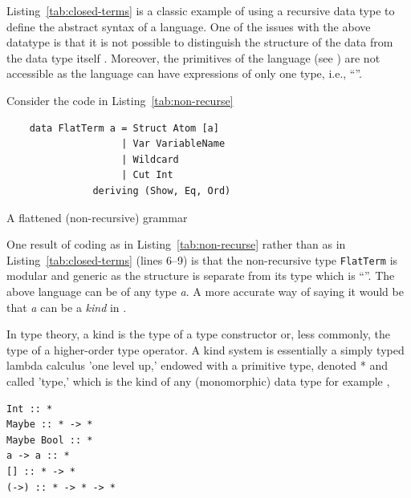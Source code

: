 \documentclass[thesis-solanki.tex]{subfiles}
\begin{document}
Listing~\ref{tab:closed-terms} is a classic example of using a recursive data type to define the
abstract syntax of a language.
One of the issues with the above datatype is that it is not possible to distinguish the structure of the data from
the data type itself \cite{sheard2004two}.
Moreover, the primitives of the language (see \cite{website:understandingalgebrasfpcomplete})
are not accessible as the language can have expressions of only one
type, i.e., ``''.

Consider the code in Listing~\ref{tab:non-recurse}
\begin{code-list}
  \begin{verbatim}
    data FlatTerm a = Struct Atom [a]
                    | Var VariableName
                    | Wildcard
                    | Cut Int
               deriving (Show, Eq, Ord)
  \end{verbatim}
  \caption{A flattened (non-recursive) grammar}
  \label{tab:non-recurse}
\end{code-list}

One result of coding as in Listing~\ref{tab:non-recurse} rather than as in
  Listing~\ref{tab:closed-terms} (lines 6--9)
  is that the non-recursive type
\texttt{FlatTerm} is modular and generic as the structure
is separate
from its
type which is ``''.
The above language can be of any type \textit{a}.
A more accurate way of saying it would be that \textit{a} can be a \textit{kind} in
.

In type theory, a kind is the type of a type constructor or, less commonly, the type of a higher-order type operator. A kind system is
essentially a simply typed lambda calculus 'one level up,' endowed with a primitive type, denoted * and called 'type,' which is the kind of
any (monomorphic) data type for example \cite{website:kindhaskellwiki},

\begin{verbatim}
Int :: *
Maybe :: * -> *
Maybe Bool :: *
a -> a :: *
[] :: * -> *
(->) :: * -> * -> *
\end{verbatim}
\end{document}
